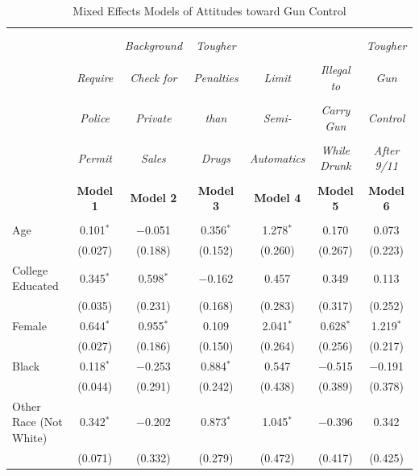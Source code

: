 \documentclass[11pt,]{article}
\begin{document}
\begin{table}[!htbp] \centering 
  \caption{Mixed Effects Models of Attitudes toward Gun Control} 
  \label{} 
\small 
\begin{tabular}{@{\extracolsep{5pt}}lcccccc} 
\\[-1.8ex]\hline \\[-1.8ex] 
\\[-1.8ex] & \emph{} & \emph{Background} & \emph{Tougher} &
                \emph{} & \emph{ } & \emph{Tougher} \\
\\[-1.8ex] & \emph{Require} & \emph{Check for} & \emph{ Penalties} &
                \emph{Limit} & \emph{Illegal to} & \emph{Gun} \\
\\[-1.8ex] & \emph{Police} & \emph{Private} & \emph{than} &
                \emph{Semi-} & \emph{Carry Gun} & \emph{Control} \\
\\[-1.8ex] & \emph{Permit} & \emph{Sales} & \emph{Drugs} &
                \emph{Automatics} & \emph{While Drunk} & \emph{After 9/11} \\
\\[-1.8ex] & \textbf{Model 1} & \textbf{Model 2} & \textbf{Model 3} & \textbf{Model 4} & \textbf{Model 5} & \textbf{Model 6}\\ 
\hline \\[-1.8ex] 
 Age & 0.101$^{*}$ & $-$0.051 & 0.356$^{*}$ & 1.278$^{*}$ & 0.170 & 0.073 \\ 
  & (0.027) & (0.188) & (0.152) & (0.260) & (0.267) & (0.223) \\ 
  College Educated & 0.345$^{*}$ & 0.598$^{*}$ & $-$0.162 & 0.457 & 0.349 & 0.113 \\ 
  & (0.035) & (0.231) & (0.168) & (0.283) & (0.317) & (0.252) \\ 
  Female & 0.644$^{*}$ & 0.955$^{*}$ & 0.109 & 2.041$^{*}$ & 0.628$^{*}$ & 1.219$^{*}$ \\ 
  & (0.027) & (0.186) & (0.150) & (0.264) & (0.256) & (0.217) \\ 
  Black & 0.118$^{*}$ & $-$0.253 & 0.884$^{*}$ & 0.547 & $-$0.515 & $-$0.191 \\ 
  & (0.044) & (0.291) & (0.242) & (0.438) & (0.389) & (0.378) \\ 
  Other Race (Not White) & 0.342$^{*}$ & $-$0.202 & 0.873$^{*}$ & 1.045$^{*}$ & $-$0.396 & 0.342 \\ 
  & (0.071) & (0.332) & (0.279) & (0.472) & (0.417) & (0.425) \\ 

\end{tabular}
\end{table}
\end{document}
